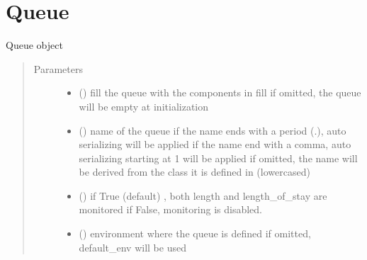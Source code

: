 \documentclass[letterpaper,10pt,english]{sphinxmanual}
\begin{document}
\section{Queue}
\label{\detokenize{Reference:queue}}

\begin{fulllineitems}
\label{\detokenize{Reference:salabim.Queue}}
Queue object
\begin{quote}\begin{description}
\item[{Parameters}] \leavevmode\begin{itemize}
\item {} 
 ({\hyperref[\detokenize{Reference:salabim.Queue}]{}}\sphinxstyleliteralemphasis{, }) \textendash{} fill the queue with the components in fill 
if omitted, the queue will be empty at initialization

\item {} 
 () \textendash{} name of the queue 
if the name ends with a period (.),
auto serializing will be applied 
if the name end with a comma,
auto serializing starting at 1 will be applied 
if omitted, the name will be derived from the class
it is defined in (lowercased)

\item {} 
 () \textendash{} if True (default) , both length and length\_of\_stay are monitored 
if False, monitoring is disabled.

\item {} 
 ({\hyperref[\detokenize{Reference:salabim.Environment}]{}}) \textendash{} environment where the queue is defined 
if omitted, default\_env will be used

\end{itemize}

\end{description}\end{quote}


\end{fulllineitems}
\end{document}
